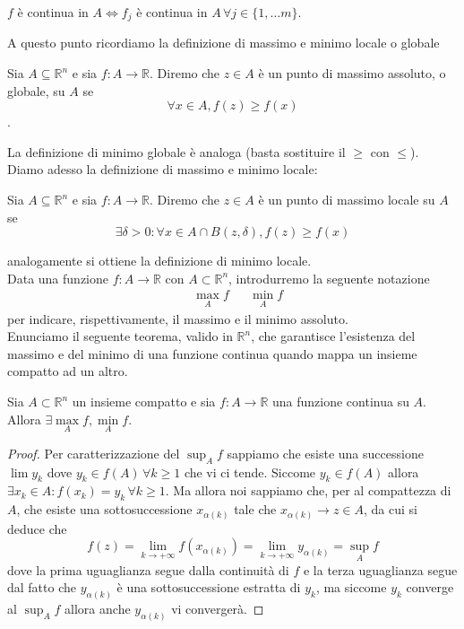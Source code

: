 \documentclass[openany]{book}
\begin{document}
\begin{remark}
$f$ è continua in $A \iff f_j$ è continua in $A \, \forall j \in \{1, \ldots m \}$.
\end{remark}
\noindent A questo punto ricordiamo la definizione di massimo e minimo locale o globale
\begin{definition}
Sia $A \subseteq \mathbb{R}^n$ e sia $f: A \to \mathbb{R}$. Diremo che $z \in A$ è un punto di massimo assoluto, o globale, su $A$ se$$\forall x \in A, f(z) \geq f(x)$$.
\end{definition}
\noindent La definizione di minimo globale è analoga (basta sostituire il $\geq$ con $\leq$). \\
Diamo adesso la definizione di massimo e minimo locale:
\begin{definition}
Sia $A \subseteq \mathbb{R}^n$ e sia $f: A \to \mathbb{R}$. Diremo che $z \in A$ è un punto di massimo locale su $A$ se
$$
\exists \delta > 0: \forall x \in A \cap B(z, \delta), f(z) \geq f(x)
$$
\end{definition}
\noindent analogamente si ottiene la definizione di minimo locale. \\ Data una funzione $f:A \to \mathbb{R}$ con $A \subset \mathbb{R}^n$, introdurremo la seguente notazione 
\begin{align*}
&\max_A{f} & &\min_A{f} 
\end{align*}
per indicare, rispettivamente, il massimo e il minimo assoluto. \\
Enunciamo il seguente teorema, valido in $\mathbb{R}^n$, che garantisce l'esistenza del massimo e del minimo di una funzione continua quando mappa un insieme compatto ad un altro. \\
\begin{theorem}
Sia $A \subset \mathbb{R}^n$ un insieme compatto e sia $f: A \to \mathbb{R}$ una funzione continua su $A$. Allora $\exists \max\limits_A{f}, \min\limits_A{f}$. 
\end{theorem}
\begin{proof}
Per caratterizzazione del $\sup_A{f}$ sappiamo che esiste una successione $\lim y_k$ dove $y_k \in f(A) \, \forall k \geq 1$ che vi ci tende. Siccome $y_k \in f(A)$ allora $\exists x_k \in A: f(x_k) = y_k \, \forall k \geq 1$. Ma allora noi sappiamo che, per al compattezza di $A$, che esiste una sottosuccessione $x_{\alpha (k)}$ tale che $x_{\alpha(k)} \to z \in A$, da cui si deduce che
$$
f(z) = \lim_{k \to +\infty} f(x_{\alpha(k)}) = \lim_{k \to +\infty} y_{\alpha(k)} = \sup_A{f}
$$
dove la prima uguaglianza segue dalla continuità di $f$ e la terza uguaglianza segue dal fatto che $y_{\alpha(k)}$ è una sottosuccessione estratta di $y_k$, ma siccome $y_k$ converge al $\sup_A{f}$ allora anche $y_{\alpha(k)}$ vi convergerà.
\end{proof}
\end{document}
